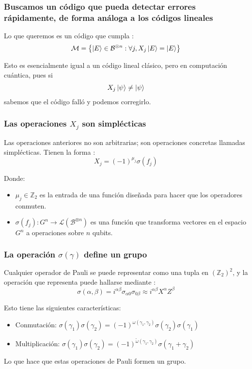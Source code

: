 \begin{frame}
  \frametitle{Buscamos un código que pueda detectar errores rápidamente, de forma análoga a los códigos lineales}

  Lo que queremos es un código que cumpla \citep{Kitaev2002}:
\begin{equation}
    \mathcal{M} = \left\{ \ket{E} \in \mathcal{B}^{\otimes n} : \forall j, X_j \ket{E} = \ket{E}\right\}
    \label{eq:stabilizers}
  \end{equation}

  Esto es esencialmente igual a un código lineal clásico, pero en computación cuántica, pues si
  \begin{equation}
    X_j \ket{\psi} \neq \ket{\psi}
    \label{eq:stabilizers_error}
  \end{equation}
  sabemos que el código falló y podemos corregirlo.

\end{frame}

\begin{frame}
  \frametitle{Las operaciones $X_j$ son simplécticas}

  Las operaciones anteriores no son arbitrarias; son operaciones concretas llamadas simplécticas. Tienen la forma \citep{Cesar2024}:
  \begin{equation}
    X_j = (-1)^{\mu_j} \sigma(f_j)
    \label{eq:symplectic}
  \end{equation}

  Donde:
  \begin{itemize}
    \item $\mu_j \in \mathbb{Z}_2$ es la entrada de una función diseñada para hacer que los operadores conmuten.
    \item $\sigma(f_j) : G^n \to \mathcal{L}(\mathcal{B}^{\otimes n})$ es una función que transforma vectores en el espacio $G^n$ a operaciones sobre $n$ qubits.
  \end{itemize}
\end{frame}

\begin{frame}[allowframebreaks]
  \frametitle{La operación $\sigma(\gamma)$ define un grupo}
  Cualquier operador de Pauli se puede representar como una tupla en $(\mathbb{Z}_2)^2$, y la operación que representa puede hallarse mediante \citep{Cesar2024}:
  \begin{equation}
    \sigma(\alpha, \beta) = i^{\alpha\beta} \sigma_{\alpha 0}\sigma_{0 \beta} \approx i^{\alpha\beta} X^\alpha Z^\beta
    \label{eq:sigma}
  \end{equation}

  Esto tiene las siguientes características:
  \begin{itemize}
    \item Conmutación: $\sigma(\gamma_1)\sigma(\gamma_2) = (-1)^{\omega(\gamma_1, \gamma_2)} \sigma(\gamma_2)\sigma(\gamma_1)$
    \item Multiplicación: $\sigma(\gamma_1)\sigma(\gamma_2) = (-1)^{\tilde{\omega}(\gamma_1, \gamma_2)} \sigma(\gamma_1 + \gamma_2)$
  \end{itemize}

  Lo que hace que estas operaciones de Pauli formen un grupo.
\end{frame}


